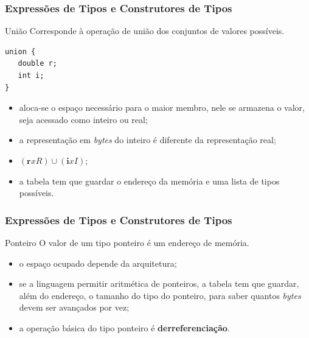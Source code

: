 \documentclass[table]{beamer}
\begin{document}
\begin{frame}[fragile]
   \frametitle{Expressões de Tipos e Construtores de Tipos}
   \begin{block}{União}
   Corresponde à operação de união dos conjuntos de valores possíveis.
   \begin{verbatim}
union {
   double r;
   int i;
}
   \end{verbatim}
   \begin{itemize}
      \item aloca-se o espaço necessário para o maior membro, nele se armazena o valor, seja acessado como inteiro ou real;
      \item a representação em \textit{bytes} do inteiro é diferente da representação real;
      \item $(\textbf{r}xR)\cup(\textbf{i}xI)$;
      \item a tabela tem que guardar o endereço da memória e uma lista de tipos possíveis.
   \end{itemize}
   \end{block}
\end{frame}

\begin{frame}[fragile]
   \frametitle{Expressões de Tipos e Construtores de Tipos}
   \begin{block}{Ponteiro}
   O valor de um tipo ponteiro é um endereço de memória.
   \begin{itemize}
      \item o espaço ocupado depende da arquitetura;
      \item se a linguagem permitir aritmética de ponteiros, a tabela tem que guardar, além do endereço, o tamanho do tipo do ponteiro, para saber quantos \textit{bytes} devem ser avançados por vez;
      \item a operação básica do tipo ponteiro é  \textbf{derreferenciação}.
   \end{itemize}
   \end{block}
\end{frame}
\end{document}
